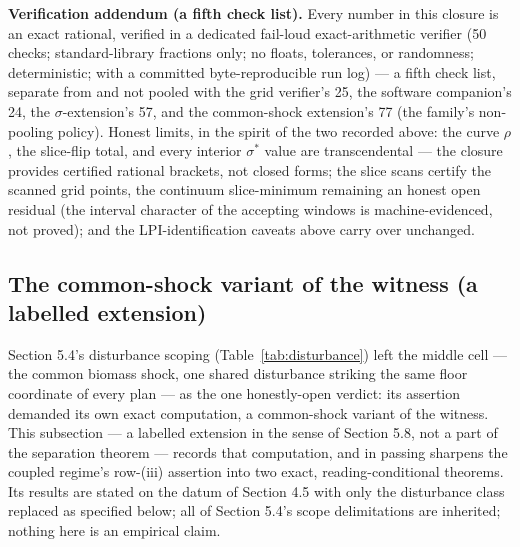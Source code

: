 \documentclass[3p,11pt]{elsarticle}
\begin{document}
\textbf{Verification addendum (a fifth check list).} Every
number in this closure is an exact rational, verified in a
dedicated fail-loud exact-arithmetic verifier (50 checks;
standard-library fractions only; no floats, tolerances, or
randomness; deterministic; with a committed byte-reproducible run
log) --- a fifth check list, separate from and not pooled with
the grid verifier's 25, the software companion's 24, the
\(\sigma\)-extension's 57, and the common-shock extension's 77
(the family's non-pooling policy). Honest limits, in the spirit
of the two recorded above: the curve \(\rho\), the slice-flip
total, and every interior \(\sigma^*\) value are transcendental
--- the closure provides certified rational brackets, not closed
forms; the slice scans certify the scanned grid points, the
continuum slice-minimum remaining an honest open residual (the
interval character of the accepting windows is
machine-evidenced, not proved); and the LPI-identification
caveats above carry over unchanged.

\subsection{The common-shock variant of the witness (a
labelled extension)}\label{common-shock-variant}

Section 5.4's disturbance scoping (Table~\ref{tab:disturbance}) left the
middle cell --- the common biomass shock, one shared disturbance striking
the same floor coordinate of every plan --- as the one honestly-open
verdict: its assertion demanded its own exact computation, a common-shock
variant of the witness. This subsection --- a labelled extension in the
sense of Section 5.8, not a part of the separation theorem --- records
that computation, and in passing sharpens the coupled regime's row-(iii)
assertion into two exact, reading-conditional theorems. Its results are
stated on the datum of Section 4.5 with only the disturbance class
replaced as specified below; all of Section 5.4's scope delimitations are
inherited; nothing here is an empirical claim.
\end{document}
